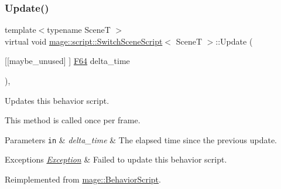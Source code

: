 \subsubsection{\texorpdfstring{Update()}{Update()}}
{\footnotesize\ttfamily template$<$typename SceneT $>$ \\
virtual void \hyperlink{classmage_1_1script_1_1_switch_scene_script}{mage\+::script\+::\+Switch\+Scene\+Script}$<$ SceneT $>$\+::Update (\begin{DoxyParamCaption}\item[{\mbox{[}\mbox{[}maybe\+\_\+unused\mbox{]} \mbox{]} \hyperlink{namespacemage_ad26233bbec640deda836e572c1a23708}{F64}}]{delta\+\_\+time }\end{DoxyParamCaption})\hspace{0.3cm}{\ttfamily [override]}, {\ttfamily [virtual]}}

Updates this behavior script.

This method is called once per frame.


\begin{DoxyParams}[1]{Parameters}
\mbox{\tt in}  & {\em delta\+\_\+time} & The elapsed time since the previous update. \\
\hline
\end{DoxyParams}

\begin{DoxyExceptions}{Exceptions}
{\em \hyperlink{classmage_1_1_exception}{Exception}} & Failed to update this behavior script. \\
\hline
\end{DoxyExceptions}


Reimplemented from \hyperlink{classmage_1_1_behavior_script_afb9cf3759edf8876416d1df85489cba6}{mage\+::\+Behavior\+Script}.

